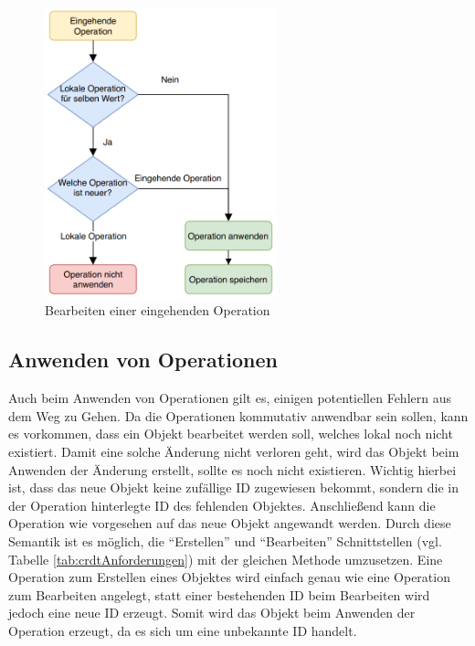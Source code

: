 \documentclass[a4paper, 12pt]{scrreprt}
\begin{document}
\begin{figure}[H]
	\centering
	\includegraphics[width=0.6\textwidth]{flowchartOperationen.png}
	\caption{Bearbeiten einer eingehenden Operation}
	\label{fig:flwochartOperationen}
\end{figure}

\subsection{Anwenden von Operationen}
\label{sec:anwendenOperationen}

Auch beim Anwenden von Operationen gilt es, einigen potentiellen Fehlern aus dem Weg zu Gehen. Da die Operationen kommutativ anwendbar sein sollen, kann es vorkommen, dass ein Objekt bearbeitet werden soll, welches lokal noch nicht existiert. Damit eine solche Änderung nicht verloren geht, wird das Objekt beim Anwenden der Änderung erstellt, sollte es noch nicht existieren. Wichtig hierbei ist, dass das neue Objekt keine zufällige ID zugewiesen bekommt, sondern die in der Operation hinterlegte ID des fehlenden Objektes. Anschließend kann die Operation wie vorgesehen auf das neue Objekt angewandt werden. Durch diese Semantik ist es möglich, die \enquote{Erstellen} und \enquote{Bearbeiten} Schnittstellen (vgl. Tabelle \ref{tab:crdtAnforderungen}) mit der gleichen Methode umzusetzen. Eine Operation zum Erstellen eines Objektes wird einfach genau wie eine Operation zum Bearbeiten angelegt, statt einer bestehenden ID beim Bearbeiten wird jedoch eine neue ID erzeugt. Somit wird das Objekt beim Anwenden der Operation erzeugt, da es sich um eine unbekannte ID handelt. 
\end{document}
